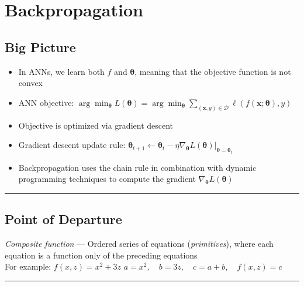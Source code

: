 \section{Backpropagation}
\subsection*{Big Picture}
\begin{itemize}
    \item In ANNs, we learn both $f$ and $\boldsymbol{\theta}$, meaning that the objective function is not convex
    \item ANN objective: 
    $
    \arg\min_{\boldsymbol{\theta}} L(\boldsymbol{\theta}) = \arg\min_{\boldsymbol{\theta}} \sum_{(\boldsymbol{x}, y) \in \mathcal{D}} \ell(f(\boldsymbol{x}; \boldsymbol{\theta}), y)
    $
    \item Objective is optimized via gradient descent
    \item Gradient descent update rule: 
    $
    \boldsymbol{\theta}_{t+1} \gets \boldsymbol{\theta}_t - \eta \nabla_{\boldsymbol{\theta}} L(\boldsymbol{\theta}) \big|_{\boldsymbol{\theta} = \boldsymbol{\theta}_t}
    $
    \item Backpropagation uses the chain rule in combination with dynamic programming techniques to compute the gradient $\nabla_{\boldsymbol{\theta}} L(\boldsymbol{\theta})$
\end{itemize}

{\color{black}\hrule height 0.001mm}

\subsection*{Point of Departure}

\emph{Composite function} --- Ordered series of equations (\emph{primitives}), where each equation is a function only of the preceding equations\\
For example:
$
f(x, z) = x^2 + 3z
$
$
a = x^2, \quad b = 3z, \quad c = a + b, \quad f(x, z) = c
$

{\color{lightgray}\hrule height 0.001mm}

